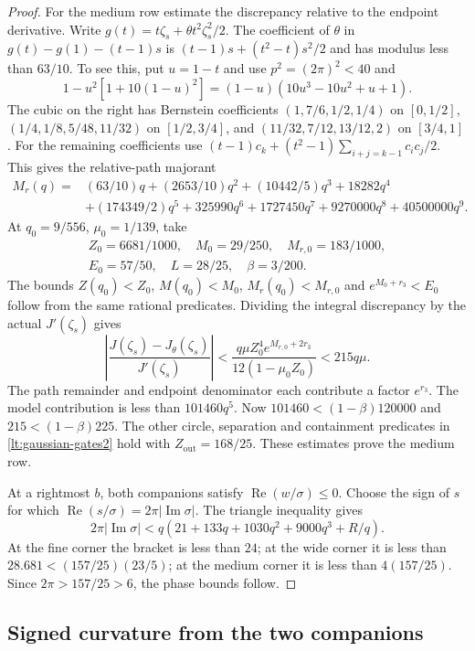 \documentclass[11pt,reqno]{amsart}
\numberwithin{equation}{section}
\theoremstyle{definition}
\theoremstyle{remark}
\renewcommand{\Re}{\operatorname{Re}}
\renewcommand{\Im}{\operatorname{Im}}
\begin{document}
\begin{proof}
For the medium row estimate the discrepancy relative to
the endpoint derivative. Write
$g(t)=t\zeta_s+\theta t^2\zeta_s^2/2$. The coefficient of $\theta$
in $g(t)-g(1)-(t-1)s$ is
$(t-1)s+(t^2-t)s^2/2$ and has modulus less than $63/10$.
To see this, put $u=1-t$ and use $p^2=(2\pi)^2<40$ and
\[
 1-u^2[1+10(1-u)^2]=(1-u)(10u^3-10u^2+u+1).
\]
The cubic on the right has Bernstein coefficients
$(1,7/6,1/2,1/4)$ on $[0,1/2]$,
$(1/4,1/8,5/48,11/32)$ on $[1/2,3/4]$, and
$(11/32,7/12,13/12,2)$ on $[3/4,1]$.
For the remaining coefficients use
$(t-1)c_k+(t^2-1)\sum_{i+j=k-1}c_ic_j/2$.
This gives the relative-path majorant
\begin{align*}
 M_r(q)={}&(63/10)q+(2653/10)q^2+(10442/5)q^3+18282q^4\\
 &+(174349/2)q^5+325990q^6+1727450q^7
       +9270000q^8+40500000q^9.
\end{align*}
At $q_0=9/556$, $\mu_0=1/139$, take
\begin{gather*}
 Z_0=6681/1000,\quad M_0=29/250,\quad M_{r,0}=183/1000,\\
 E_0=57/50,\quad L=28/25,\quad\beta=3/200.
\end{gather*}
The bounds $Z(q_0)<Z_0$, $M(q_0)<M_0$, $M_r(q_0)<M_{r,0}$ and
$e^{M_0+r_3}<E_0$ follow from the same rational predicates.
Dividing the integral discrepancy by the actual $J'(\zeta_s)$ gives
\begin{equation}\label{lt:relative-gaussian-error}
 \left|\frac{J(\zeta_s)-J_\theta(\zeta_s)}{J'(\zeta_s)}\right|
 <\frac{q\mu Z_0^4e^{M_{r,0}+2r_3}}{12(1-\mu_0Z_0)}
 <215q\mu.
\end{equation}
The path remainder and endpoint denominator each contribute a factor
$e^{r_3}$. The model contribution is less than
$101460q^5$. Now $101460<(1-\beta)120000$ and
$215<(1-\beta)225$. The other circle, separation and containment
predicates in \eqref{lt:gaussian-gates2} hold with
$Z_{\mathrm{out}}=168/25$.
These estimates prove the medium row.

At a rightmost $b$, both companions satisfy $\Re(w/\sigma)\le0$.
Choose the sign of $s$ for which
$\Re(s/\sigma)=2\pi|\Im\sigma|$. The triangle inequality gives
\[
 2\pi|\Im\sigma|<q\left(21+133q+1030q^2+9000q^3+R/q\right).
\]
At the fine corner the bracket is less than $24$; at the wide corner
it is less than $28.681<(157/25)(23/5)$; at the medium corner it is
less than $4(157/25)$. Since $2\pi>157/25>6$, the phase bounds follow.
\end{proof}

\subsection{Signed curvature from the two companions}
\end{document}
